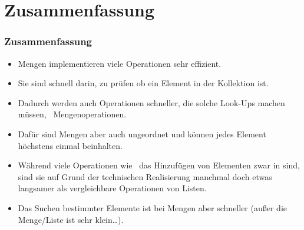 \documentclass[aspectratio=169,mathserif,notheorems]{beamer}%
\begin{document}
\section{Zusammenfassung}%
%
\begin{frame}%
\frametitle{Zusammenfassung}%
\begin{itemize}%
\item Mengen implementieren viele Operationen sehr effizient.%
\item<2-> Sie sind schnell darin, zu prüfen ob ein Element in der Kollektion ist.%
\item<3-> Dadurch werden auch Operationen schneller, die solche Look-Ups machen müssen, \DEzB~Mengenoperationen.%
\item<4-> Dafür sind Mengen aber auch ungeordnet und können jedes Element höchstens einmal beinhalten.%
\item<5-> Während viele Operationen wie \DEzB~das Hinzufügen von Elementen zwar in  sind, sind sie auf Grund der technischen Realisierung manchmal doch etwas langsamer als vergleichbare Operationen von Listen.%
\item<6-> Das Suchen bestimmter Elemente ist bei Mengen aber schneller (außer die Menge/Liste ist sehr klein\dots).%
%
\end{itemize}%
\end{frame}%
%
\endPresentation%
\end{document}
